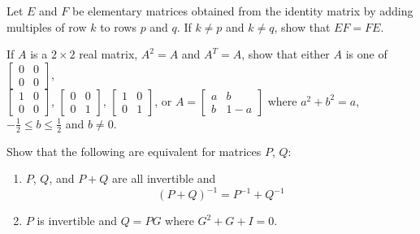 \documentclass{ximera}
\begin{document}
\begin{problem}\label{prob:4.82}
Let $E$ and $F$ be elementary matrices obtained from the identity matrix by adding multiples of row $k$ to rows $p$ and $q$. If $k \neq p$ and $k \neq q$, show that $EF = FE$.

\end{problem}

\begin{problem}\label{prob:4.83}
If $A$ is a $2 \times 2$ real matrix, $A^{2} = A$ and $A^{T} = A$, show that either $A$ is one of $\left[ \begin{array}{rr}
0 & 0 \\
0 & 0
\end{array} \right]$, \\ $\left[ \begin{array}{rr}
1 & 0 \\
0 & 0
\end{array} \right]$, $\left[ \begin{array}{rr}
0 & 0 \\
0 & 1
\end{array} \right]$, $\left[ \begin{array}{rr}
1 & 0 \\
0 & 1
\end{array} \right]$, or $A = \left[ \begin{array}{cc}
a & b \\
b & 1 - a
\end{array} \right]$
 where $a^{2} + b^{2} = a$, $-\frac{1}{2} \leq b \leq \frac{1}{2}$ and $b \neq 0$.

\end{problem}

\begin{problem}\label{prob:4.84}
Show that the following are equivalent for matrices $P$, $Q$:


\begin{enumerate}
\item $P$, $Q$, and $P + Q$ are all invertible and
\begin{equation*}
(P + Q)^{-1} = P^{-1} + Q^{-1}
\end{equation*}

\item $P$ is invertible and $Q = PG$ where $G^{2} + G + I = 0$.

\end{enumerate}
\end{problem}
\end{document}
